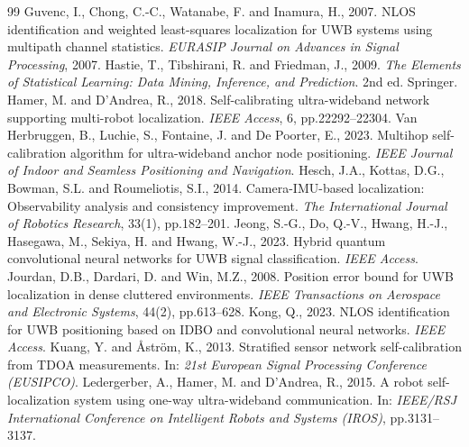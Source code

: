 \documentclass[11pt,a4paper]{article}
\begin{document}
\begin{thebibliography}{99}
 Guvenc, I., Chong, C.-C., Watanabe, F. and Inamura, H., 2007. NLOS identification and weighted least-squares localization for UWB systems using multipath channel statistics. \emph{EURASIP Journal on Advances in Signal Processing}, 2007.
 Hastie, T., Tibshirani, R. and Friedman, J., 2009. \emph{The Elements of Statistical Learning: Data Mining, Inference, and Prediction}. 2nd ed. Springer.
 Hamer, M. and D'Andrea, R., 2018. Self-calibrating ultra-wideband network supporting multi-robot localization. \emph{IEEE Access}, 6, pp.22292--22304.
 Van Herbruggen, B., Luchie, S., Fontaine, J. and De Poorter, E., 2023. Multihop self-calibration algorithm for ultra-wideband anchor node positioning. \emph{IEEE Journal of Indoor and Seamless Positioning and Navigation}.
 Hesch, J.A., Kottas, D.G., Bowman, S.L. and Roumeliotis, S.I., 2014. Camera-IMU-based localization: Observability analysis and consistency improvement. \emph{The International Journal of Robotics Research}, 33(1), pp.182--201.
 Jeong, S.-G., Do, Q.-V., Hwang, H.-J., Hasegawa, M., Sekiya, H. and Hwang, W.-J., 2023. Hybrid quantum convolutional neural networks for UWB signal classification. \emph{IEEE Access}.
 Jourdan, D.B., Dardari, D. and Win, M.Z., 2008. Position error bound for UWB localization in dense cluttered environments. \emph{IEEE Transactions on Aerospace and Electronic Systems}, 44(2), pp.613--628.
 Kong, Q., 2023. NLOS identification for UWB positioning based on IDBO and convolutional neural networks. \emph{IEEE Access}.
 Kuang, Y. and \AA{}str\"om, K., 2013. Stratified sensor network self-calibration from TDOA measurements. In: \emph{21st European Signal Processing Conference (EUSIPCO)}.
 Ledergerber, A., Hamer, M. and D'Andrea, R., 2015. A robot self-localization system using one-way ultra-wideband communication. In: \emph{IEEE/RSJ International Conference on Intelligent Robots and Systems (IROS)}, pp.3131--3137.

\end{thebibliography}
\end{document}

